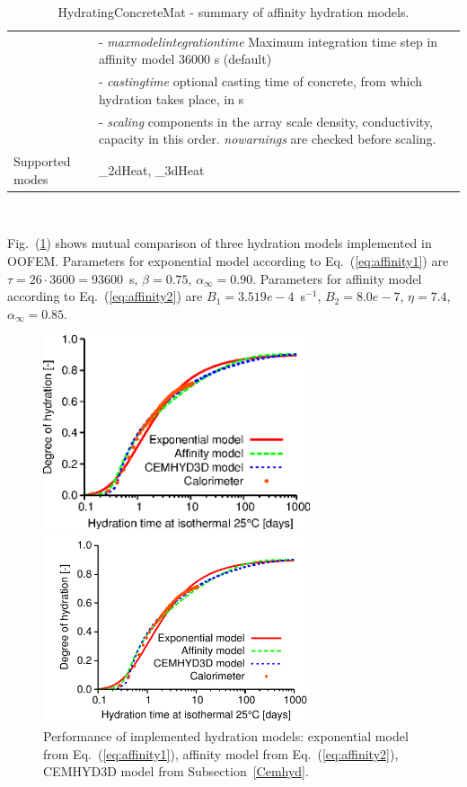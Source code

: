 \documentclass[a4paper]{article}
\newcommand{\param}[1]{{\it #1}}
\newcommand{\refeq}[1]{Eq.~(\ref{#1})}
\newcommand{\reffig}[1]{Fig.~(\ref{#1})}
\newenvironment{mmt}{\begin{tabular}{|l|p{9cm}|}}{\end{tabular}\\}
\newenvironment{mmt}{\begin{tabular}{|l|l|}}{\end{tabular}\\}
\begin{document}
\begin{table}[!htb]
\begin{mmt}
&- \param{maxmodelintegrationtime} Maximum integration time step in affinity model 36000 s (default)\\
&- \param{castingtime} optional casting time of concrete, from which hydration takes place, in s\\
&- \param{scaling} components in the array scale density, conductivity, capacity in this order. \param{nowarnings} are checked before scaling.\\
Supported modes& \_2dHeat, \_3dHeat\\
\hline
\end{mmt}
\caption{HydratingConcreteMat - summary of affinity hydration models.}
\label{Affinity1_table}
\end{table}

\reffig{hydration_comparison} shows mutual comparison of three hydration models implemented in OOFEM. Parameters for exponential model according to \refeq{eq:affinity1} are $\tau=26\cdot3600=93600$~s, $\beta=0.75$, $\alpha_\infty=0.90$. Parameters for affinity model according to \refeq{eq:affinity2} are $B_1=3.519e-4$~s$^{-1}$, $B_2=8.0e-7$, $\eta=7.4$, $\alpha_\infty=0.85$.

\begin{figure}[!htb]
\begin{htmlonly}
  \centerline{\includegraphics[width=0.7\textwidth]{Mokra_OOFEM_affinity_time.eps}}
\end{htmlonly}
 \centerline{\includegraphics[width=0.7\textwidth]{Mokra_OOFEM_affinity_time}}
  \caption{Performance of implemented hydration models: exponential model from \refeq{eq:affinity1}, affinity model from \refeq{eq:affinity2}, CEMHYD3D model from Subsection~\ref{Cemhyd}.}
  \label{hydration_comparison}
\end{figure}
\end{document}
